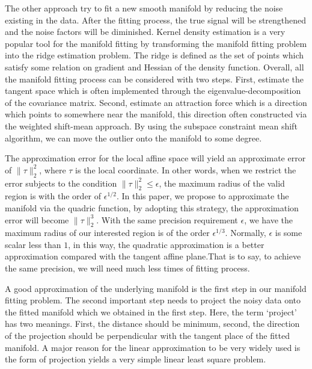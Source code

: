 \documentclass[aos,preprint]{imsart}
\theoremstyle{remark}
\begin{document}
 The other approach try to fit a new smooth manifold by reducing the noise existing in the data. After the fitting process, the true signal will be strengthened and the noise factors will be diminished. Kernel density estimation \cite{genovese2014nonparametric,ozertem2011locally} is a very popular tool for the manifold fitting by transforming the manifold fitting problem into the ridge estimation problem. The ridge is defined as the set of points which satisfy some relation on gradient and Hessian of the density function. Overall, all the manifold fitting process can be considered with two steps. First, estimate the tangent space which is often implemented through the eigenvalue-decomposition of the covariance matrix. Second,  estimate an attraction force which is a  direction which points to somewhere near the manifold, this direction often constructed via the weighted shift-mean approach. By using the subspace constraint mean shift algorithm, we can move the outlier onto the manifold to some degree.
 
 The approximation error for the local affine space will yield an approximate error of $\|\tau\|_2^2$, where $\tau$ is the local coordinate. In other words, when we restrict the error subjects to the condition $\|\tau\|_2^2\leq \epsilon$, the maximum radius of the valid region is with the order of $\epsilon^{1/2}$. In this paper, we propose to approximate the manifold via the quadric function, by adopting this strategy, the approximation error will become $\|\tau\|_2^3$.  With the same precision requirement $\epsilon$, we have the maximum radius of our interested region is of the order $\epsilon^{1/3}$. Normally, $\epsilon$ is some scalar less than $1$, in this way, the quadratic approximation is a better approximation compared with the tangent affine plane.That is to say, to achieve the same precision, we will need much less times of fitting process.

A good approximation of the underlying manifold is the first step in our manifold fitting problem. The second important step needs to project the noisy data onto the fitted manifold which we obtained in the first step. Here, the term `project' has two meanings. First, the distance should be minimum, second, the direction of the projection should be perpendicular with the tangent place of the fitted manifold. A major reason for the linear approximation to be very widely used is the form of projection yields a very simple linear least square problem.


\end{document}
